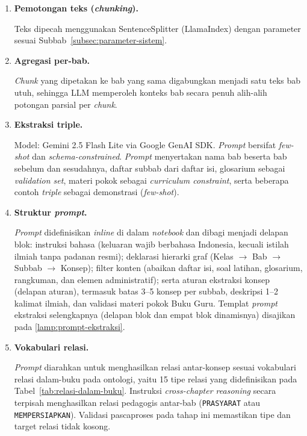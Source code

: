 \documentclass[../../thesis]{subfiles}
\begin{document}
\begin{enumerate}
  \item \textbf{Pemotongan teks (\textit{chunking}).}

  Teks dipecah menggunakan SentenceSplitter (LlamaIndex) dengan parameter
  sesuai Subbab~\ref{subsec:parameter-sistem}.

  \item \textbf{Agregasi per-bab.}

  \textit{Chunk} yang dipetakan ke bab yang sama digabungkan menjadi satu teks
  bab utuh, sehingga LLM memperoleh konteks bab secara penuh alih-alih potongan
  parsial per \textit{chunk}.

  \item \textbf{Ekstraksi triple.}

  Model: Gemini 2.5 Flash Lite via Google GenAI SDK. \textit{Prompt} bersifat
  \textit{few-shot} dan \textit{schema-constrained}. \textit{Prompt} menyertakan nama bab 
  beserta bab sebelum dan sesudahnya, daftar subbab dari daftar isi, glosarium sebagai 
  \textit{validation set}, materi pokok sebagai \textit{curriculum constraint},
  serta beberapa contoh \textit{triple} sebagai demonstrasi (\textit{few-shot}).

  \item \textbf{Struktur \textit{prompt}.}

  \textit{Prompt} didefinisikan \textit{inline} di dalam \textit{notebook} dan dibagi menjadi delapan blok:
  instruksi bahasa (keluaran wajib berbahasa Indonesia, kecuali istilah ilmiah
  tanpa padanan resmi); deklarasi hierarki graf (Kelas $\to$ Bab $\to$ Subbab
  $\to$ Konsep); filter konten (abaikan daftar isi, soal latihan, glosarium,
  rangkuman, dan elemen administratif); serta aturan ekstraksi konsep (delapan
  aturan), termasuk batas 3--5 konsep per subbab, deskripsi 1--2 kalimat ilmiah,
  dan validasi materi pokok Buku Guru. Templat \textit{prompt} ekstraksi
  selengkapnya (delapan blok dan empat blok dinamisnya) disajikan pada
  \ref{lamp:prompt-ekstraksi}.

  \item \textbf{Vokabulari relasi.}

  \textit{Prompt} diarahkan untuk menghasilkan relasi antar-konsep sesuai
  vokabulari relasi dalam-buku pada ontologi, yaitu 15 tipe relasi yang
  didefinisikan pada Tabel~\ref{tab:relasi-dalam-buku}. Instruksi
  \textit{cross-chapter reasoning} secara terpisah menghasilkan relasi
  pedagogis antar-bab (\texttt{PRASYARAT} atau \texttt{MEMPERSIAPKAN}).
  Validasi pascaproses pada tahap ini memastikan tipe dan target relasi tidak
  kosong.


\end{enumerate}
\end{document}

